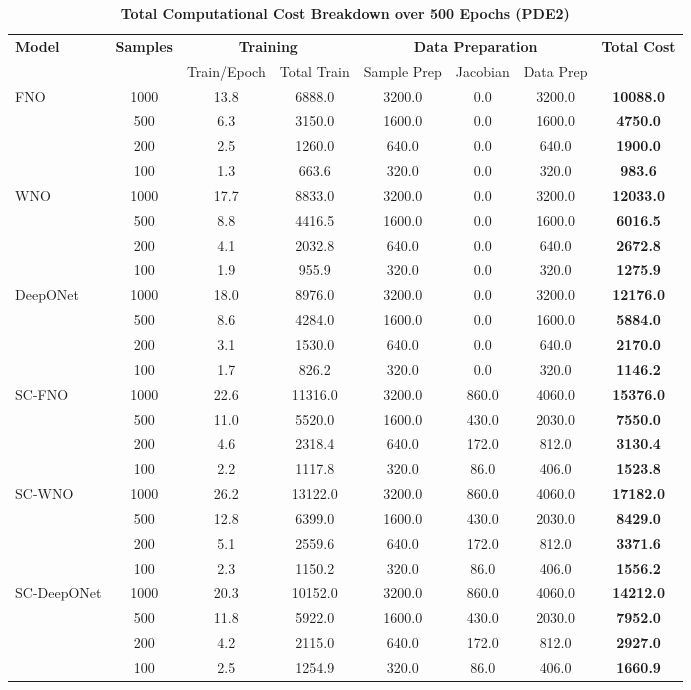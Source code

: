 \begin{table}[htbp]
\centering
\caption{\textbf{Total Computational Cost Breakdown over 500 Epochs (PDE2)}}
\label{tab:PDE2_total_computational_cost}
\scriptsize
\setlength{\tabcolsep}{3pt}
\begin{tabular}{l|c|cc|ccc|c}
\hline
\textbf{Model} & \textbf{Samples} & \multicolumn{2}{c|}{\textbf{Training}} & \multicolumn{3}{c|}{\textbf{Data Preparation}} & \textbf{Total Cost} \\
& & Train/Epoch & Total Train & Sample Prep & Jacobian & Data Prep &  \\
\hline
FNO & 1000& 13.8& 6888.0& 3200.0& 0.0& 3200.0& \textbf{10088.0}\\
    & 500& 6.3& 3150.0& 1600.0& 0.0& 1600.0& \textbf{4750.0}\\
    & 200& 2.5& 1260.0& 640.0& 0.0& 640.0& \textbf{1900.0}\\
    & 100& 1.3& 663.6& 320.0& 0.0& 320.0& \textbf{983.6}\\
\hline
WNO & 1000& 17.7& 8833.0& 3200.0& 0.0& 3200.0& \textbf{12033.0}\\
    & 500& 8.8& 4416.5& 1600.0& 0.0& 1600.0& \textbf{6016.5}\\
    & 200& 4.1& 2032.8& 640.0& 0.0& 640.0& \textbf{2672.8}\\
    & 100& 1.9& 955.9& 320.0& 0.0& 320.0& \textbf{1275.9}\\
\hline
DeepONet & 1000& 18.0& 8976.0& 3200.0& 0.0& 3200.0& \textbf{12176.0}\\
         & 500& 8.6& 4284.0& 1600.0& 0.0& 1600.0& \textbf{5884.0}\\
         & 200& 3.1& 1530.0& 640.0& 0.0& 640.0& \textbf{2170.0}\\
         & 100& 1.7& 826.2& 320.0& 0.0& 320.0& \textbf{1146.2}\\
\hline
SC-FNO & 1000& 22.6& 11316.0& 3200.0& 860.0& 4060.0& \textbf{15376.0}\\
       & 500& 11.0& 5520.0& 1600.0& 430.0& 2030.0& \textbf{7550.0}\\
       & 200& 4.6& 2318.4& 640.0& 172.0& 812.0& \textbf{3130.4}\\
       & 100& 2.2& 1117.8& 320.0& 86.0& 406.0& \textbf{1523.8}\\
\hline
SC-WNO & 1000& 26.2& 13122.0& 3200.0& 860.0& 4060.0& \textbf{17182.0}\\
       & 500& 12.8& 6399.0& 1600.0& 430.0& 2030.0& \textbf{8429.0}\\
       & 200& 5.1& 2559.6& 640.0& 172.0& 812.0& \textbf{3371.6}\\
       & 100& 2.3& 1150.2& 320.0& 86.0& 406.0& \textbf{1556.2}\\
\hline
SC-DeepONet & 1000& 20.3& 10152.0& 3200.0& 860.0& 4060.0& \textbf{14212.0}\\
            & 500& 11.8& 5922.0& 1600.0& 430.0& 2030.0& \textbf{7952.0}\\
            & 200& 4.2& 2115.0& 640.0& 172.0& 812.0& \textbf{2927.0}\\
            & 100& 2.5& 1254.9& 320.0& 86.0& 406.0& \textbf{1660.9}\\
\hline
\end{tabular}
\end{table}
